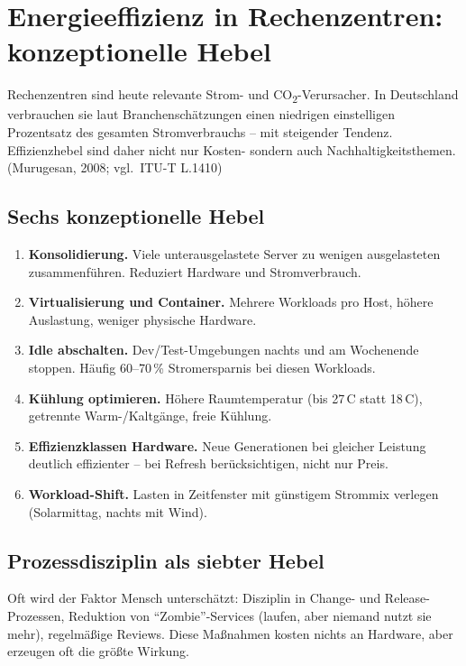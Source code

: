 \documentclass[11pt,a4paper,oneside]{article}
\newcommand{\fachbegriff}[1]{\textbf{#1}}
\newcommand{\quelle}[1]{{\footnotesize\color{lpGray}(#1)}}
\begin{document}
\section{Energieeffizienz in Rechenzentren: konzeptionelle Hebel}

Rechenzentren sind heute relevante Strom- und CO\textsubscript{2}-Verursacher. In Deutschland verbrauchen sie laut Branchenschätzungen einen niedrigen einstelligen Prozentsatz des gesamten Stromverbrauchs -- mit steigender Tendenz. Effizienzhebel sind daher nicht nur Kosten- sondern auch Nachhaltigkeitsthemen. \quelle{Murugesan, 2008; vgl.\ ITU-T L.1410}

\subsection{Sechs konzeptionelle Hebel}

\begin{enumerate}
  \item \fachbegriff{Konsolidierung.} Viele unterausgelastete Server zu wenigen ausgelasteten zusammenführen. Reduziert Hardware und Stromverbrauch.
  \item \fachbegriff{Virtualisierung und Container.} Mehrere Workloads pro Host, höhere Auslastung, weniger physische Hardware.
  \item \fachbegriff{Idle abschalten.} Dev/Test-Umgebungen nachts und am Wochenende stoppen. Häufig 60--70\,\% Stromersparnis bei diesen Workloads.
  \item \fachbegriff{Kühlung optimieren.} Höhere Raumtemperatur (bis 27\,\textdegree{}C statt 18\,\textdegree{}C), getrennte Warm-/Kaltgänge, freie Kühlung.
  \item \fachbegriff{Effizienzklassen Hardware.} Neue Generationen bei gleicher Leistung deutlich effizienter -- bei Refresh berücksichtigen, nicht nur Preis.
  \item \fachbegriff{Workload-Shift.} Lasten in Zeitfenster mit günstigem Strommix verlegen (Solarmittag, nachts mit Wind).
\end{enumerate}

\subsection{Prozessdisziplin als siebter Hebel}

Oft wird der Faktor Mensch unterschätzt: Disziplin in Change- und Release-Prozessen, Reduktion von ``Zombie''-Services (laufen, aber niemand nutzt sie mehr), regelmäßige Reviews. Diese Maßnahmen kosten nichts an Hardware, aber erzeugen oft die größte Wirkung.
\end{document}
